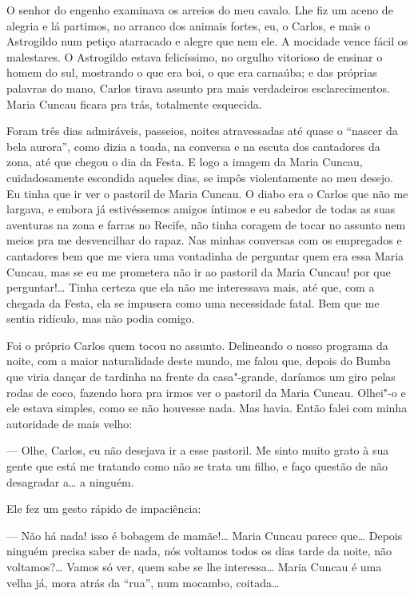 O senhor do engenho examinava os arreios do meu cavalo. Lhe fiz um aceno
de alegria e lá partimos, no arranco dos animais fortes, eu, o Carlos, e
mais o Astrogildo num petiço atarracado e alegre que nem ele. A mocidade
vence fácil os malestares. O Astrogildo estava felicíssimo, no orgulho
vitorioso de ensinar o homem do sul, mostrando o que era boi, o que era
carnaúba; e das próprias palavras do mano, Carlos tirava assunto pra
mais verdadeiros esclarecimentos. Maria Cuncau ficara pra trás,
totalmente esquecida.

Foram três dias admiráveis, passeios, noites atravessadas até quase o
``nascer da bela aurora'', como dizia a toada, na conversa e na escuta
dos cantadores da zona, até que chegou o dia da Festa. E logo a imagem
da Maria Cuncau, cuidadosamente escondida aqueles dias, se impôs
violentamente ao meu desejo. Eu tinha que ir ver o pastoril de Maria
Cuncau. O diabo era o Carlos que não me largava, e embora já
estivéssemos amigos íntimos e eu sabedor de todas as suas aventuras na
zona e farras no Recife, não tinha coragem de tocar no assunto nem meios
pra me desvencilhar do rapaz. Nas minhas conversas com os empregados e
cantadores bem que me viera uma vontadinha de perguntar quem era essa
Maria Cuncau, mas se eu me prometera não ir ao pastoril da Maria Cuncau!
por que perguntar!\ldots{} Tinha certeza que ela não me interessava mais, até
que, com a chegada da Festa, ela se impusera como uma necessidade fatal.
Bem que me sentia ridículo, mas não podia comigo.

Foi o próprio Carlos quem tocou no assunto. Delineando o nosso programa
da noite, com a maior naturalidade deste mundo, me falou que, depois do
Bumba que viria dançar de tardinha na frente da casa"-grande, daríamos um
giro pelas rodas de coco, fazendo hora pra irmos ver o pastoril da Maria
Cuncau. Olhei"-o e ele estava simples, como se não houvesse nada. Mas
havia. Então falei com minha autoridade de mais velho:

--- Olhe, Carlos, eu não desejava ir a esse pastoril. Me sinto muito
grato à sua gente que está me tratando como não se trata um filho, e
faço questão de não desagradar a\ldots{} a ninguém.

Ele fez um gesto rápido de impaciência:

--- Não há nada! isso é bobagem de mamãe!\ldots{} Maria Cuncau parece que\ldots{}
Depois ninguém precisa saber de nada, nós voltamos todos os dias tarde
da noite, não voltamos?\ldots{} Vamos só ver, quem sabe se lhe interessa\ldots{}
Maria Cuncau é uma velha já, mora atrás da ``rua'', num mocambo,
coitada\ldots{}

